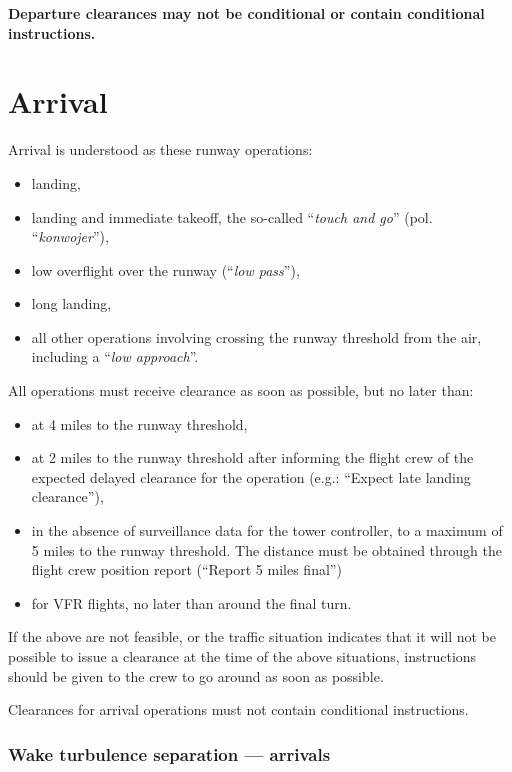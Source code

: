 \textbf{Departure clearances may not be conditional or contain conditional instructions.}

\clearpage
\section{Arrival}
Arrival is understood as these runway operations:
\begin{itemize}
    \item landing,
    \item landing and immediate takeoff, the so-called ``\emph{touch and go}'' (pol. ``\emph{konwojer}''), 
    \item low overflight over the runway (``\emph{low pass}''),
    \item long landing,
    \item all other operations involving crossing the runway threshold from the air, including a ``\emph{low approach}''.
\end{itemize}

All operations must receive clearance as soon as possible, but no later than:
\begin{itemize}
    \item at 4 miles to the runway threshold,
    \item at 2 miles to the runway threshold after informing the flight crew of the expected delayed clearance for the operation (e.g.: ``Expect late landing clearance''),
    \item in the absence of surveillance data for the tower controller, to a maximum of 5 miles to the runway threshold.
    The distance must be obtained through the flight crew position report (``Report 5 miles final'')
    \item for VFR flights, no later than around the final turn.
\end{itemize}
If the above are not feasible, or the traffic situation indicates that it will not be possible to issue a clearance at the time of the above situations, instructions should be given to the crew to go around as soon as possible.

Clearances for arrival operations must not contain conditional instructions.

\subsubsection{Wake turbulence separation --- arrivals}

